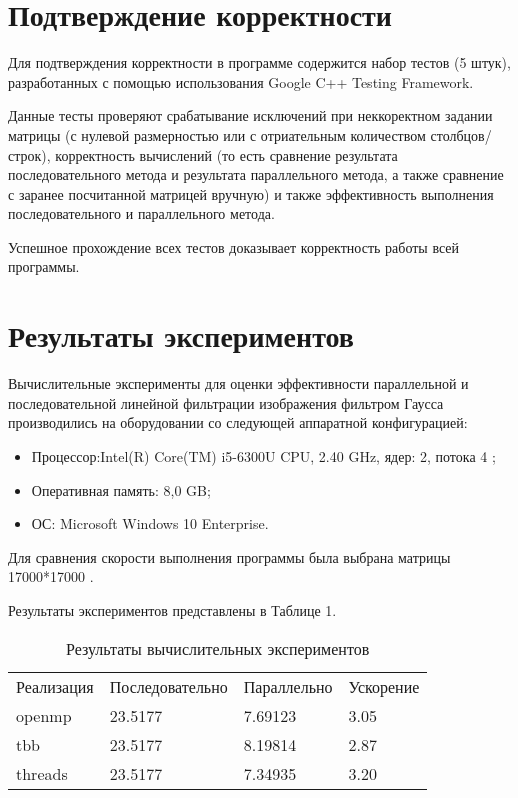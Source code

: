 \documentclass{report}
\begin{document}
\section*{Подтверждение корректности}
Для подтверждения корректности в программе содержится набор тестов (5 штук), разработанных с помощью использования Google C++ Testing Framework.
\par Данные тесты проверяют срабатывание исключений при неккоректном задании матрицы (с нулевой размерностью или с отриательным количеством столбцов/строк), корректность вычислений (то есть сравнение результата последовательного метода и результата параллельного метода, а также сравнение с заранее посчитанной матрицей вручную) и также эффективность выполнения последовательного и параллельного метода.
\par Успешное прохождение всех тестов доказывает корректность работы всей программы.
\newpage

\section*{Результаты экспериментов}
Вычислительные эксперименты для оценки эффективности параллельной и последовательной линейной фильтрации изображения фильтром Гаусса производились на оборудовании со следующей аппаратной конфигурацией:

\begin{itemize}
\item Процессор:Intel(R) Core(TM) i5-6300U CPU, 2.40 GHz, ядер: 2, потока  4 ;
\item Оперативная память: 8,0 GB;
\item ОС: Microsoft Windows 10 Enterprise.
\end{itemize}

\par Для сравнения скорости выполнения программы была выбрана матрицы 17000*17000 . 
\par Результаты экспериментов представлены в Таблице 1.

\begin{table}[!h]
\caption{Результаты вычислительных экспериментов}
\centering
\begin{tabular}{p{4cm} p{4cm} p{4cm} p{4cm}}
Реализация & Последовательно & Параллельно & Ускорение  \\
openmp        & 23.5177          & 7.69123     & 3.05       \\
tbb        & 23.5177         & 8.19814     & 2.87       \\
threads        & 23.5177         & 7.34935     & 3.20         
\end{tabular}
\end{table}
\end{document}
